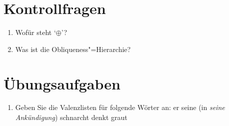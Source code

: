 




\section*{Kontrollfragen}


\begin{enumerate}
\item Wofür steht `$\oplus$'?
\item Was ist die Obliqueness"=Hierarchie?
\end{enumerate}

\section*{Übungsaufgaben}

\begin{enumerate}
\item Geben Sie die Valenzlisten für folgende Wörter an:
      \eal
      \ex er
      \ex seine (in \emph{seine Ankündigung})
      \ex schnarcht
      \ex denkt
      \ex graut
      \zl
\end{enumerate}
